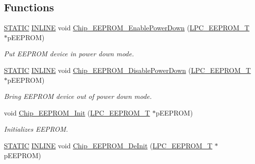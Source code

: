 \subsection*{Functions}
\begin{DoxyCompactItemize}
\item 
\hyperlink{group___l_p_c___types___public___macros_ga10b2d890d871e1489bb02b7e70d9bdfb}{S\+T\+A\+T\+IC} \hyperlink{spifi__18xx__43xx_8h_a2eb6f9e0395b47b8d5e3eeae4fe0c116}{I\+N\+L\+I\+NE} void \hyperlink{group___e_e_p_r_o_m__18_x_x__43_x_x_gacce700347262d143041848308f8f3f6f}{Chip\+\_\+\+E\+E\+P\+R\+O\+M\+\_\+\+Enable\+Power\+Down} (\hyperlink{struct_l_p_c___e_e_p_r_o_m___t}{L\+P\+C\+\_\+\+E\+E\+P\+R\+O\+M\+\_\+T} $\ast$p\+E\+E\+P\+R\+OM)
\begin{DoxyCompactList}\small\item\em Put E\+E\+P\+R\+OM device in power down mode. \end{DoxyCompactList}\item 
\hyperlink{group___l_p_c___types___public___macros_ga10b2d890d871e1489bb02b7e70d9bdfb}{S\+T\+A\+T\+IC} \hyperlink{spifi__18xx__43xx_8h_a2eb6f9e0395b47b8d5e3eeae4fe0c116}{I\+N\+L\+I\+NE} void \hyperlink{group___e_e_p_r_o_m__18_x_x__43_x_x_ga6cf4052474abe94b3c47ce09b67bb03f}{Chip\+\_\+\+E\+E\+P\+R\+O\+M\+\_\+\+Disable\+Power\+Down} (\hyperlink{struct_l_p_c___e_e_p_r_o_m___t}{L\+P\+C\+\_\+\+E\+E\+P\+R\+O\+M\+\_\+T} $\ast$p\+E\+E\+P\+R\+OM)
\begin{DoxyCompactList}\small\item\em Bring E\+E\+P\+R\+OM device out of power down mode. \end{DoxyCompactList}\item 
void \hyperlink{group___e_e_p_r_o_m__18_x_x__43_x_x_ga6f3f3f16f0e24eaa45bbfd7089ed43bb}{Chip\+\_\+\+E\+E\+P\+R\+O\+M\+\_\+\+Init} (\hyperlink{struct_l_p_c___e_e_p_r_o_m___t}{L\+P\+C\+\_\+\+E\+E\+P\+R\+O\+M\+\_\+T} $\ast$p\+E\+E\+P\+R\+OM)
\begin{DoxyCompactList}\small\item\em Initializes E\+E\+P\+R\+OM. \end{DoxyCompactList}\item 
\hyperlink{group___l_p_c___types___public___macros_ga10b2d890d871e1489bb02b7e70d9bdfb}{S\+T\+A\+T\+IC} \hyperlink{spifi__18xx__43xx_8h_a2eb6f9e0395b47b8d5e3eeae4fe0c116}{I\+N\+L\+I\+NE} void \hyperlink{group___e_e_p_r_o_m__18_x_x__43_x_x_ga8b179a01d2c806ab4797712c3fc47098}{Chip\+\_\+\+E\+E\+P\+R\+O\+M\+\_\+\+De\+Init} (\hyperlink{struct_l_p_c___e_e_p_r_o_m___t}{L\+P\+C\+\_\+\+E\+E\+P\+R\+O\+M\+\_\+T} $\ast$p\+E\+E\+P\+R\+OM)

\end{DoxyCompactItemize}
